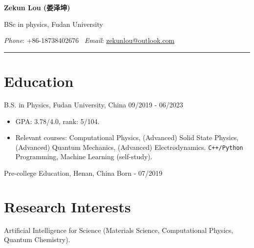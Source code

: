 \documentclass[11pt]{article} %
\begin{document}
\begin{center}

\textbf{\Large Zekun Lou ({\kaishu 娄泽坤})}

\vspace{2ex}

BSc in physics, Fudan University


{\itshape Phone}: +86-18738402676 \
{\itshape Email}: \href{mailto:zekunlou@outlook.com}{zekunlou@outlook.com}
\end{center}

\vspace{-3ex}
\rule{\textwidth}{1pt}
\vspace{-4ex}



\section*{Education}

B.S. in Physics, Fudan University, China
\hfill 09/2019 - 06/2023

\begin{itemize}
    \item GPA: 3.78/4.0, rank: 5/104.
    \item Relevant courses: Computational Physics, (Advanced) Solid State Physics, (Advanced) Quantum Mechanics, (Advanced) Electrodynamics. \verb|C++/Python| Programming, Machine Learning (self-study).
\end{itemize}

Pre-college Education, Henan, China
\hfill Born - 07/2019




\section*{Research Interests}

Artificial Intelligence for Science (Materials Science, Computational Physics, Quantum Chemistry).
\end{document}
